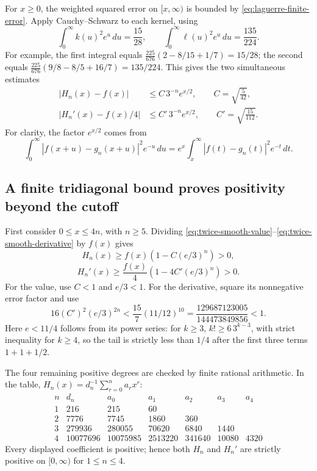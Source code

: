 \documentclass[11pt,a4paper]{article}
\theoremstyle{definition}
\begin{document}
For $x\ge0$, the weighted squared error on $[x,\infty)$ is bounded by
\eqref{eq:laguerre-finite-error}. Apply Cauchy--Schwarz to each kernel,
using
\[
 \int_0^\infty k(u)^2e^u\,du=\frac{15}{28},\qquad
 \int_0^\infty\ell(u)^2e^u\,du=\frac{135}{224}.
\]
For example, the first integral equals
$\frac{225}{676}(2-8/15+1/7)=15/28$; the second equals
$\frac{225}{676}(9/8-8/5+16/7)=135/224$.
This gives the two simultaneous estimates
\begin{align}
 |H_n(x)-f(x)|
 &\le C\,3^{-n}e^{x/2},\qquad C=\sqrt{\frac5{42}},
 \label{eq:twice-smooth-value}\\
 |H_n'(x)-f(x)/4|
 &\le C'\,3^{-n}e^{x/2},\qquad C'=\sqrt{\frac{15}{112}}.
 \label{eq:twice-smooth-derivative}
\end{align}
For clarity, the factor $e^{x/2}$ comes from
\[
 \int_0^\infty |f(x+u)-g_n(x+u)|^2e^{-u}\,du
 =e^x\int_x^\infty |f(t)-g_n(t)|^2e^{-t}\,dt.
\]

\subsection{A finite tridiagonal bound proves positivity beyond the cutoff}

First consider $0\le x\le4n$, with $n\ge5$. Dividing
\eqref{eq:twice-smooth-value}--\eqref{eq:twice-smooth-derivative} by $f(x)$
gives
\[
 H_n(x)\ge f(x)\left(1-C(e/3)^n\right)>0,
\]
\[
 H_n'(x)\ge\frac{f(x)}4
   \left(1-4C'(e/3)^n\right)>0.
\]
For the value, use $C<1$ and $e/3<1$. For the derivative, square its
nonnegative error factor and use
\[
 16(C')^2(e/3)^{2n}
 <\frac{15}{7}(11/12)^{10}
 =\frac{129687123005}{144473849856}<1.
\]
Here $e<11/4$ follows from its power series: for $k\ge3$,
$k!\ge6\,3^{k-3}$, with strict inequality for $k\ge4$, so the tail is
strictly less than $1/4$ after the first three terms $1+1+1/2$.

The four remaining positive degrees are checked by finite rational
arithmetic. In the table, $H_n(x)=d_n^{-1}\sum_{r=0}^n a_rx^r$:
\[
\begin{array}{c|r|rrrrr}
 n&d_n&a_0&a_1&a_2&a_3&a_4\\\hline
 1&216&215&60&&&\\
 2&7776&7745&1860&360&&\\
 3&279936&280055&70620&6840&1440&\\
 4&10077696&10075985&2513220&341640&10080&4320
\end{array}
\]
Every displayed coefficient is positive; hence both $H_n$ and $H_n'$
are strictly positive on $[0,\infty)$ for $1\le n\le4$.
\end{document}

